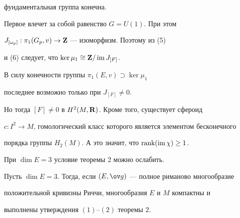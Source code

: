 \begin{pf}
фундаментальная группа конечна.


Первое влечет за собой равенство $G=U(1)$. При этом


$J_{[\omega_p]}:\pi_1(G_p,v)\to{\bold Z}$ --- изоморфизм. Поэтому из (5)


и (6) следует, что $\ker\mu_1\cong{{\bold Z}}/\operatorname{im} J_{[F]}$.


В силу конечности группы $\pi_1(E,v)\supset\ker\mu_1$


последнее возможно только при $J_{[F]}\ne 0$.


Но тогда $[F]\ne 0$ в $H^2(M,{\bold R})$. Кроме того, существует сфероид


$c:I^2\to M$, гомологический класс которого является элементом бесконечного


порядка группы $H_2(M)$. А это значит, что $\operatorname{rank}(\operatorname{im}\chi)\ge 1$.


\end{pf}





При $\dim E=3$ условие теоремы 2 можно ослабить.





\begin{thm}


Пусть $\dim E=3$. Тогда, если $(E,\g)$ --- полное риманово многообразие


положительной кривизны Риччи, многообразия $E$ и $M$ компактны и


выполнены утверждения $(1)$--$(2)$ теоремы $2$.


\end{thm}





